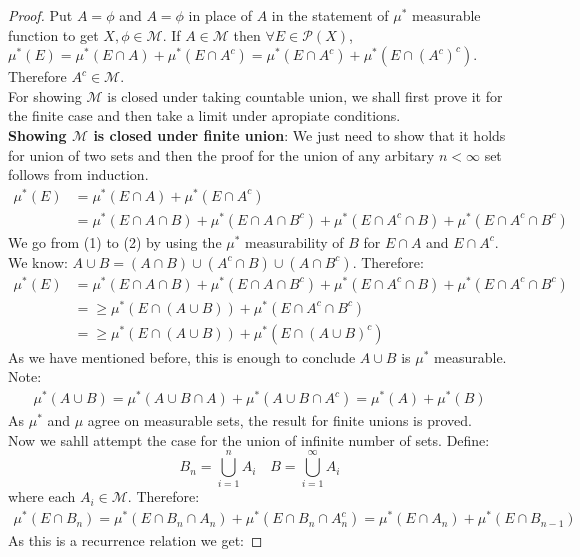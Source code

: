 \documentclass[oneside]{article}
\begin{document}
\begin{proof}
    Put $A=\phi$ and $A=\phi$ in place of $A$ in the statement of $\mu^*$ measurable function to get $X,\phi\in\mathcal{M}$. If $A\in\mathcal{M}$ then $\forall E\in\mathcal{P}(X)$, $\mu^*(E)=\mu^*(E\cap A)+\mu^*(E\cap A^c)=\mu^*(E\cap A^c)+\mu^*(E\cap (A^c)^c)$. Therefore $A^c\in\mathcal M$.\\
    For showing $\mathcal{M}$ is closed under taking countable union, we shall first prove it for the finite case and then take a limit under apropiate conditions.\\
    \textbf{Showing $\mathcal{M}$ is closed under finite union}: We just need to show that it holds for union of two sets and then the proof for the union of any arbitary $n<\infty$ set follows from induction. 
    \begin{align}
        \mu^*(E)&=\mu^*(E\cap A)+\mu^*(E\cap A^c)\\
        &=\mu^*(E\cap A\cap B)+\mu^*(E\cap A\cap B^c)+\mu^*(E\cap A^c\cap B)+\mu^*(E\cap A^c\cap B^c)
    \end{align}
    We go from (1) to (2) by using the $\mu^*$ measurability of $B$ for $E\cap A$ and $E\cap A^c$.  We know: $A\cup B=(A\cap B)\cup(A^c\cap B)\cup(A\cap B^c)$. Therefore:
    \begin{align}
        \mu^*(E)&=\mu^*(E\cap A\cap B)+\mu^*(E\cap A\cap B^c)+\mu^*(E\cap A^c\cap B)+\mu^*(E\cap A^c\cap B^c)\\
        &=\geq \mu^*(E\cap(A\cup B))+\mu^*(E\cap A^c\cap B^c)\\
        &=\geq \mu^*(E\cap(A\cup B))+\mu^*(E\cap (A\cup B)^c)
    \end{align}  
    As we have mentioned before, this is enough to conclude $A\cup B$ is $\mu^*$ measurable. Note:
    \begin{align}
        \mu^*(A\cup B)=\mu^*(A\cup B\cap A)+\mu^*(A\cup B\cap A^c)=\mu^*(A)+\mu^*(B)
    \end{align}
    As $\mu^*$ and $\mu$ agree on measurable sets, the result for finite unions is proved.\\
    Now we sahll attempt the case for the union of infinite number of sets. 
    Define:
    $$B_n=\bigcup_{i=1}^n A_i\quad B=\bigcup_{i=1}^\infty A_i$$
    where each $A_i\in\mathcal{M}$. Therefore:
    \begin{align}
        \mu^*(E\cap B_n)=\mu^*(E\cap B_n\cap A_n)+\mu^*(E\cap B_n\cap A_n^c)=\mu^*(E\cap A_n)+\mu^*(E\cap B_{n-1})
    \end{align}
    As this is a recurrence relation we get:

\end{proof}
\end{document}

